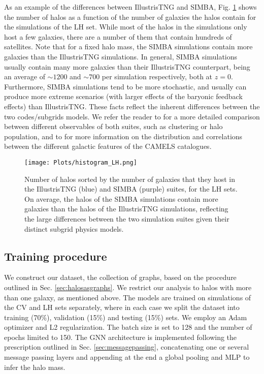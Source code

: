 \documentclass[twocolumn]{aastex631}
\begin{document}
As an example of the differences between IllustrisTNG and SIMBA, Fig. \ref{fig:histogram} shows the number of halos as a function of the number of galaxies the halos contain for the simulations of the LH set. While most of the halos in the simulations only host a few galaxies, there are a number of them that contain hundreds of satellites. Note that for a fixed halo mass, the SIMBA simulations contain more galaxies than the IllustrisTNG simulations. In general, SIMBA simulations usually contain many more galaxies than their IllustrisTNG counterpart, being an average of $\sim 1200$ and $\sim 700$ per simulation respectively, both at $z=0$. Furthermore, SIMBA simulations tend to be more stochastic, and usually can produce more extreme scenarios (with larger effects of the baryonic feedback effects) than IllustrisTNG. These facts reflect the inherent differences between the two codes/subgrids models. We refer the reader to \cite{villaescusanavarro2020camels} for a more detailed comparison between different observables of both suites, such as clustering or halo population, and to \cite{2022arXiv220101300V, 2022arXiv220413713V} for more information on the distribution and correlations between the different galactic features of the CAMELS catalogues.




\begin{figure}[t!]
\begin{center}
\texttt{[image: Plots/histogram\_LH.png]}
\caption{Number of halos sorted by the number of galaxies that they host in the IllustrisTNG (blue) and SIMBA (purple) suites, for the LH sets. On average, the halos of the SIMBA simulations contain more galaxies than the halos of the IllustrisTNG simulations, reflecting the large differences between the two simulation suites given their distinct subgrid physics models.}
\label{fig:histogram}
\end{center}
\end{figure}

\subsection{Training procedure}
\label{sec:training}


We construct our dataset, the collection of graphs, based on the procedure outlined in Sec. \ref{sec:halosasgraphs}. We restrict our analysis to halos with more than one galaxy, as mentioned above. The models are trained on simulations of the CV and LH sets separately, where in each case we split the dataset into training (70\%), validation (15\%) and testing (15\%) sets. We employ an Adam optimizer \citep{kingma2014method} and L2 regularization. The batch size is set to 128 and the number of epochs limited to 150. The GNN architecture is implemented following the prescription outlined in Sec. \ref{sec:messagepassing}, concatenating one or several message passing layers and appending at the end a global pooling and MLP to infer the halo mass.
\end{document}
